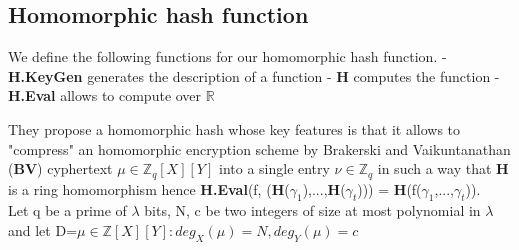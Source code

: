 \subsection{Homomorphic hash function}
We define the following functions for our homomorphic hash function. 
\tabNormal - \textbf{H.KeyGen} generates the description of a function  
\tabNormal - \textbf{H} computes the function
\tabNormal - \textbf{H.Eval} allows to compute over $\mathbb{R}$

They propose a homomorphic hash whose key features is that it allows to "compress" an homomorphic encryption scheme by Brakerski and Vaikuntanathan (\textbf{BV}) \cite{Brakerski_and_Vaikuntanathan} cyphertext $\mu \in \mathbb{Z}_q[X][Y]$ into a single entry $\nu \in \mathbb{Z}_q$ in such a way that \textbf{H} is a ring homomorphism hence \textbf{H.Eval}(f, (\textbf{H}($\gamma_1$),...,\textbf{H}($\gamma_t$))) = \textbf{H}(f($\gamma_1$,...,$\gamma_t$)). \\

Let q be a prime of $\lambda$ bits, N, c be two integers of size at most polynomial in $\lambda$ and let D=${\mu \in \mathbb{Z}[X][Y]: deg_X(\mu) = N, deg_Y(\mu) = c}$



